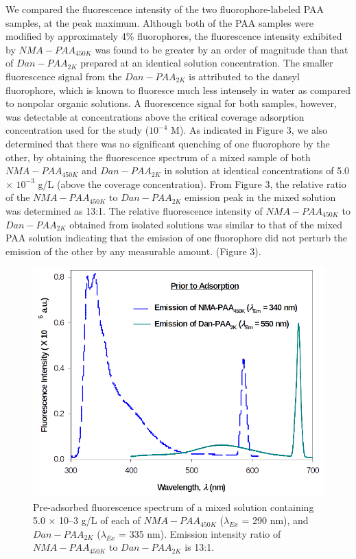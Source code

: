 \documentclass[journal=mamobx,manuscript=article]{achemso}
\begin{document}
We compared the fluorescence intensity of the two fluorophore-labeled PAA samples, at the peak maximum.  Although both of the PAA samples were modified by approximately 4\% fluorophores, the fluorescence intensity exhibited by $NMA-PAA_{450K}$ was found to be greater by an order of magnitude than that of $Dan-PAA_{2K}$ prepared at an identical solution concentration.  The smaller fluorescence signal from the $Dan-PAA_{2K}$ is attributed to the dansyl fluorophore, which is known to fluoresce much less intensely in water as compared to nonpolar organic solutions.\cite{weber1954fluorescent,Bednar1985,Chen1983}  A fluorescence signal for both samples, however, was detectable at concentrations above the critical coverage adsorption concentration used for the study ($10^{-4}$ M).  As indicated in Figure 3, we also determined that there was no significant quenching of one fluorophore by the other, by obtaining the fluorescence spectrum of a mixed sample of both $NMA-PAA_{450K}$ and $Dan-PAA_{2K}$ in solution at identical concentrations of 5.0 $\times$ $10^{-3}$ g/L (above the coverage concentration).  From Figure 3, the relative ratio of the $NMA-PAA_{450K}$ to $Dan-PAA_{2K}$ emission peak in the mixed solution was determined as 13:1.  The relative fluorescence intensity of $NMA-PAA_{450K}$ to $Dan-PAA_{2K}$ obtained from isolated solutions was similar to that of the mixed PAA solution indicating that the emission of one fluorophore did not perturb the emission of the other by any measurable amount. (Figure 3).

\begin{figure}[H]
\includegraphics[scale=2.0]{fig3.png}
\caption{Pre-adsorbed fluorescence spectrum of a mixed solution containing 5.0 × 10–3 g/L of each of $NMA-PAA_{450K}$ ($\lambda_{Ex}$ = 290 nm), and $Dan-PAA_{2K}$ ($\lambda_{Ex}$ = 335 nm).  Emission intensity ratio of $NMA-PAA_{450K}$ to $Dan-PAA_{2K}$  is 13:1.}
\label{figure 3}
\end{figure}
\end{document}
